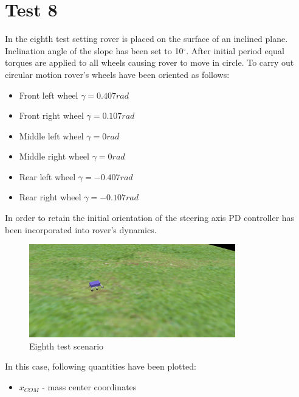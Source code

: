 \newpage
\section{Test 8}
\label{Sec:test_8}

In the eighth test setting rover is placed on the surface of an inclined plane. Inclination angle of the slope has been set to 10$^\circ$. After initial period equal torques are applied to all wheels causing rover to move in circle. To carry out circular motion rover's wheels have been oriented as follows:

\begin{itemize} 
  \item Front left wheel $\gamma = 0.407rad$           
  \item Front right wheel $\gamma = 0.107rad$        
  \item Middle left wheel $\gamma = 0rad$           
  \item Middle right wheel $\gamma = 0rad$        
  \item Rear left wheel $\gamma = -0.407rad$           
  \item Rear right wheel $\gamma = -0.107rad$        
\end{itemize}

\noindent In order to retain the initial orientation of the steering axis PD controller has been incorporated into rover's dynamics. 

\begin{figure}[H]
  \centering
    \includegraphics[width=0.8\textwidth]{run_8}
  \caption{Eighth test scenario}
\end{figure}

\noindent In this case, following quantities have been plotted:

\begin{itemize}
  \item $x_{COM}$ - mass center coordinates
\end{itemize}

